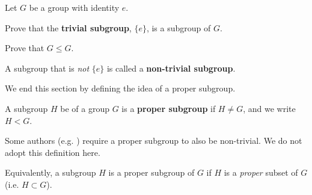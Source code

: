 \newpage

\begin{exercise}
    Let $G$ be a group with identity $e$. 
    \begin{partquestions}{\alph*}
        \item Prove that the \textbf{trivial subgroup}, $\{e\}$, is a subgroup of $G$.
        \item Prove that $G \leq G$.
    \end{partquestions}
\end{exercise}
\begin{remark}
    A subgroup that is \textit{not} $\{e\}$ is called a \textbf{non-trivial subgroup}.
\end{remark}

We end this section by defining the idea of a proper subgroup.
\begin{definition}
    A subgroup $H$ be of a group $G$ is a \textbf{proper subgroup} if $H \neq G$, and we write $H < G$.
\end{definition}
\begin{remark}
    Some authors (e.g. {\cite[p.~32]{hungerford_1980}}) require a proper subgroup to also be non-trivial. We do not adopt this definition here.
\end{remark}
\begin{remark}
    Equivalently, a subgroup $H$ is a proper subgroup of $G$ if $H$ is a \textit{proper} subset of $G$ (i.e. $H \subset G$).
\end{remark}

